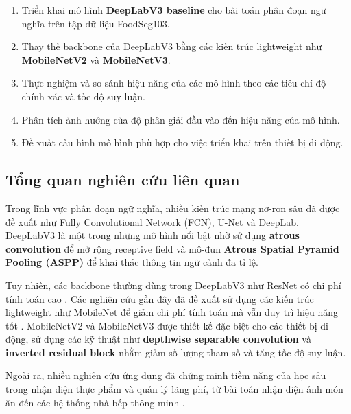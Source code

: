 \begin{enumerate}
    \item Triển khai mô hình \textbf{DeepLabV3 baseline} cho bài toán phân đoạn ngữ nghĩa trên tập dữ liệu FoodSeg103.
    \item Thay thế backbone của DeepLabV3 bằng các kiến trúc lightweight như \textbf{MobileNetV2} và \textbf{MobileNetV3}.
    \item Thực nghiệm và so sánh hiệu năng của các mô hình theo các tiêu chí độ chính xác và tốc độ suy luận.
    \item Phân tích ảnh hưởng của độ phân giải đầu vào đến hiệu năng của mô hình.
    \item Đề xuất cấu hình mô hình phù hợp cho việc triển khai trên thiết bị di động.
\end{enumerate}

\subsection{Tổng quan nghiên cứu liên quan}

Trong lĩnh vực phân đoạn ngữ nghĩa, nhiều kiến trúc mạng nơ-ron sâu đã được đề xuất như Fully Convolutional Network (FCN), U-Net và DeepLab. DeepLabV3 là một trong những mô hình nổi bật nhờ sử dụng \textbf{atrous convolution} để mở rộng receptive field và mô-đun \textbf{Atrous Spatial Pyramid Pooling (ASPP)} để khai thác thông tin ngữ cảnh đa tỉ lệ.

Tuy nhiên, các backbone thường dùng trong DeepLabV3 như ResNet có chi phí tính toán cao \parencite{he2015residual}. Các nghiên cứu gần đây đã đề xuất sử dụng các kiến trúc lightweight như MobileNet để giảm chi phí tính toán mà vẫn duy trì hiệu năng tốt \parencite{dong2020mobilenetv2}. MobileNetV2 và MobileNetV3 được thiết kế đặc biệt cho các thiết bị di động, sử dụng các kỹ thuật như \textbf{depthwise separable convolution} và \textbf{inverted residual block} nhằm giảm số lượng tham số và tăng tốc độ suy luận.

Ngoài ra, nhiều nghiên cứu ứng dụng đã chứng minh tiềm năng của học sâu trong nhận diện thực phẩm và quản lý lãng phí, từ bài toán nhận diện ảnh món ăn đến các hệ thống nhà bếp thông minh \parencite{yanai2015foodimage,lubura2022foodrecognition,chakraborty2024aikitchen}.
